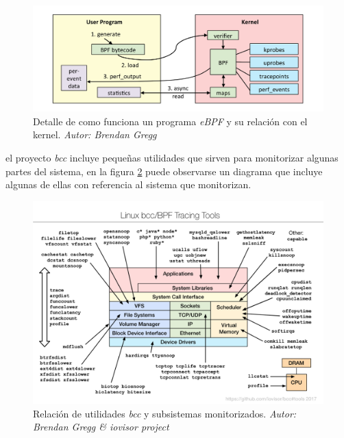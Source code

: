 \begin{figure}[h]
  \centering
    \includegraphics[scale=0.3]{images/linux_ebpf_internals}
  \caption{Detalle de como funciona un programa \emph{eBPF} y su relación con el kernel. \emph{Autor: Brendan Gregg}}
  \label{fig:ebpf-internals}
\end{figure}

el proyecto \emph{bcc} incluye pequeñas utilidades que sirven para monitorizar algunas partes del sistema, en la figura \ref{fig:bcc-tracing-tools} puede observarse un diagrama que incluye algunas de ellas
con referencia al sistema que monitorizan.

\begin{figure}[h]
  \centering
    \includegraphics[scale=0.65]{images/bcc_tracing_tools}
  \caption{Relación de utilidades \emph{bcc} y subsistemas monitorizados. \emph{Autor: Brendan Gregg \& iovisor project}}
  \label{fig:bcc-tracing-tools}
\end{figure}

